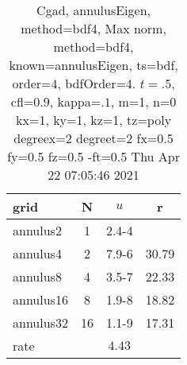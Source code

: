 \begin{table}[H]\tableFont %
\begin{center}
\begin{tabular}{|l|c|c|c|} \hline 
grid  & N &  $ u $ & r \\ \hline 
  annulus2 &     1 & \num{2.4}{-4} &        \\ \hline
  annulus4 &     2 & \num{7.9}{-6} & 30.79  \\ \hline
  annulus8 &     4 & \num{3.5}{-7} & 22.33  \\ \hline
 annulus16 &     8 & \num{1.9}{-8} & 18.82  \\ \hline
 annulus32 &    16 & \num{1.1}{-9} & 17.31  \\ \hline
    rate             &       &  $4.43$       &       \\ \hline
\end{tabular}
\caption{Cgad, annulusEigen, method=bdf4, Max norm, method=bdf4, known=annulusEigen, ts=bdf, order=$4$, bdfOrder=4. $t=.5$, cfl=$0.9$, kappa=$.1$, m=1, n=0 kx=1, ky=1, kz=1,  tz=poly degreex=2 degreet=2 fx=0.5 fy=0.5 fz=0.5 -ft=0.5 Thu Apr 22 07:05:46 2021}\label{table:annulusEigenbdf4Order4Max}
\end{center}
\end{table}
